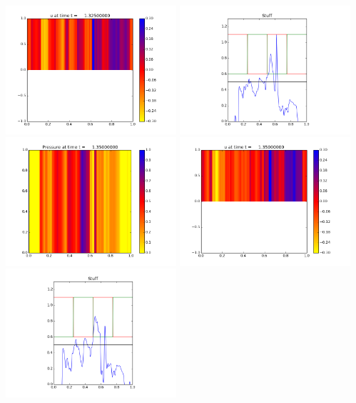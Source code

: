 \documentclass[11pt]{article}
\begin{document}
\includegraphics[width=0.475\textwidth]{frame0053fig1.png}
\vskip 10pt 
\includegraphics[width=0.475\textwidth]{frame0053fig3.png}
\vskip 10pt 
\includegraphics[width=0.475\textwidth]{frame0054fig0.png}
\includegraphics[width=0.475\textwidth]{frame0054fig1.png}
\vskip 10pt 
\includegraphics[width=0.475\textwidth]{frame0054fig3.png}
\end{document}
